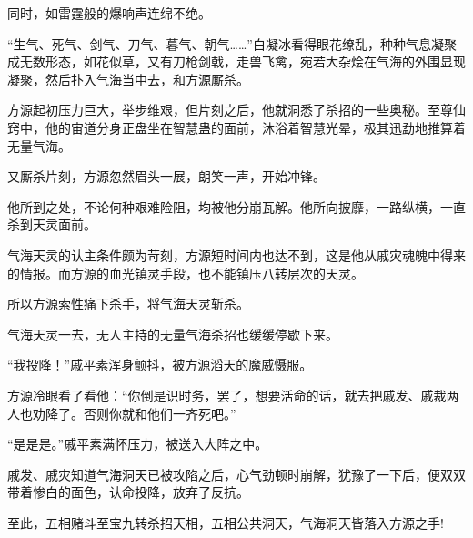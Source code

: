 \begin{this_body}
同时，如雷霆般的爆响声连绵不绝。

“生气、死气、剑气、刀气、暮气、朝气……”白凝冰看得眼花缭乱，种种气息凝聚成无数形态，如花似草，又有刀枪剑戟，走兽飞禽，宛若大杂烩在气海的外围显现凝聚，然后扑入气海当中去，和方源厮杀。

方源起初压力巨大，举步维艰，但片刻之后，他就洞悉了杀招的一些奥秘。至尊仙窍中，他的宙道分身正盘坐在智慧蛊的面前，沐浴着智慧光晕，极其迅勐地推算着无量气海。

又厮杀片刻，方源忽然眉头一展，朗笑一声，开始冲锋。

他所到之处，不论何种艰难险阻，均被他分崩瓦解。他所向披靡，一路纵横，一直杀到天灵面前。

气海天灵的认主条件颇为苛刻，方源短时间内也达不到，这是他从戚灾魂魄中得来的情报。而方源的血光镇灵手段，也不能镇压八转层次的天灵。

所以方源索性痛下杀手，将气海天灵斩杀。

气海天灵一去，无人主持的无量气海杀招也缓缓停歇下来。

“我投降！”戚平素浑身颤抖，被方源滔天的魔威慑服。

方源冷眼看了看他：“你倒是识时务，罢了，想要活命的话，就去把戚发、戚裁两人也劝降了。否则你就和他们一齐死吧。”

“是是是。”戚平素满怀压力，被送入大阵之中。

戚发、戚灾知道气海洞天已被攻陷之后，心气劲顿时崩解，犹豫了一下后，便双双带着惨白的面色，认命投降，放弃了反抗。

至此，五相赌斗至宝九转杀招天相，五相公共洞天，气海洞天皆落入方源之手!

\end{this_body}

